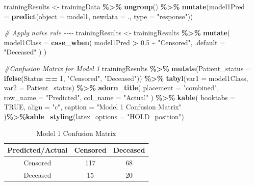 \documentclass[
]{article}
\newenvironment{Shaded}{\begin{snugshade}}{\end{snugshade}}
\newcommand{\AttributeTok}[1]{\textcolor[rgb]{0.13,0.29,0.53}{#1}}
\newcommand{\CommentTok}[1]{\textcolor[rgb]{0.56,0.35,0.01}{\textit{#1}}}
\newcommand{\ConstantTok}[1]{\textcolor[rgb]{0.56,0.35,0.01}{#1}}
\newcommand{\DecValTok}[1]{\textcolor[rgb]{0.00,0.00,0.81}{#1}}
\newcommand{\FloatTok}[1]{\textcolor[rgb]{0.00,0.00,0.81}{#1}}
\newcommand{\FunctionTok}[1]{\textcolor[rgb]{0.13,0.29,0.53}{\textbf{#1}}}
\newcommand{\NormalTok}[1]{#1}
\newcommand{\OtherTok}[1]{\textcolor[rgb]{0.56,0.35,0.01}{#1}}
\newcommand{\SpecialCharTok}[1]{\textcolor[rgb]{0.81,0.36,0.00}{\textbf{#1}}}
\newcommand{\StringTok}[1]{\textcolor[rgb]{0.31,0.60,0.02}{#1}}
\begin{document}
\begin{Shaded}
\begin{Highlighting}[]
\NormalTok{trainingResults }\OtherTok{\textless{}{-}}\NormalTok{ trainingData }\SpecialCharTok{\%\textgreater{}\%}
  \FunctionTok{ungroup}\NormalTok{() }\SpecialCharTok{\%\textgreater{}\%}
  \FunctionTok{mutate}\NormalTok{(}\AttributeTok{model1Pred =} \FunctionTok{predict}\NormalTok{(}\AttributeTok{object =}\NormalTok{ model1, }\AttributeTok{newdata =}\NormalTok{ ., }\AttributeTok{type =} \StringTok{"response"}\NormalTok{))}

\CommentTok{\# Apply naïve rule {-}{-}{-}{-}}
\NormalTok{trainingResults }\OtherTok{\textless{}{-}}\NormalTok{ trainingResults }\SpecialCharTok{\%\textgreater{}\%}
  \FunctionTok{mutate}\NormalTok{(}
    \AttributeTok{model1Class =} \FunctionTok{case\_when}\NormalTok{(}
\NormalTok{      model1Pred }\SpecialCharTok{\textgreater{}} \FloatTok{0.5} \SpecialCharTok{\textasciitilde{}} \StringTok{"Censored"}\NormalTok{,}
      \AttributeTok{.default =} \StringTok{"Deceased"}
\NormalTok{    )}
\NormalTok{  )}

\CommentTok{\#Confusion Matrix for Model 1}
\NormalTok{trainingResults }\SpecialCharTok{\%\textgreater{}\%}
  \FunctionTok{mutate}\NormalTok{(}\AttributeTok{Patient\_status =} \FunctionTok{ifelse}\NormalTok{(Status }\SpecialCharTok{==} \DecValTok{1}\NormalTok{, }\StringTok{"Censored"}\NormalTok{, }\StringTok{"Deceased"}\NormalTok{)) }\SpecialCharTok{\%\textgreater{}\%}
  \FunctionTok{tabyl}\NormalTok{(}\AttributeTok{var1 =}\NormalTok{ model1Class, }\AttributeTok{var2 =}\NormalTok{ Patient\_status) }\SpecialCharTok{\%\textgreater{}\%}
  \FunctionTok{adorn\_title}\NormalTok{(}
    \AttributeTok{placement =} \StringTok{"combined"}\NormalTok{,}
    \AttributeTok{row\_name =} \StringTok{"Predicted"}\NormalTok{,}
    \AttributeTok{col\_name =} \StringTok{"Actual"}
\NormalTok{  ) }\SpecialCharTok{\%\textgreater{}\%}
  \FunctionTok{kable}\NormalTok{(}
    \AttributeTok{booktabs =} \ConstantTok{TRUE}\NormalTok{,}
    \AttributeTok{align =} \StringTok{"c"}\NormalTok{,}
    \AttributeTok{caption =} \StringTok{"Model 1 Confusion Matrix"}
\NormalTok{  )}\SpecialCharTok{\%\textgreater{}\%}\FunctionTok{kable\_styling}\NormalTok{(}\AttributeTok{latex\_options =} \StringTok{"HOLD\_position"}\NormalTok{)}
\end{Highlighting}
\end{Shaded}

\begin{table}[H]

\caption{\label{tab:unnamed-chunk-36}Model 1 Confusion Matrix}
\centering
\begin{tabular}[t]{ccc}
\toprule
Predicted/Actual & Censored & Deceased\\
\midrule
Censored & 117 & 68\\
Deceased & 15 & 20\\
\bottomrule
\end{tabular}
\end{table}
\end{document}
